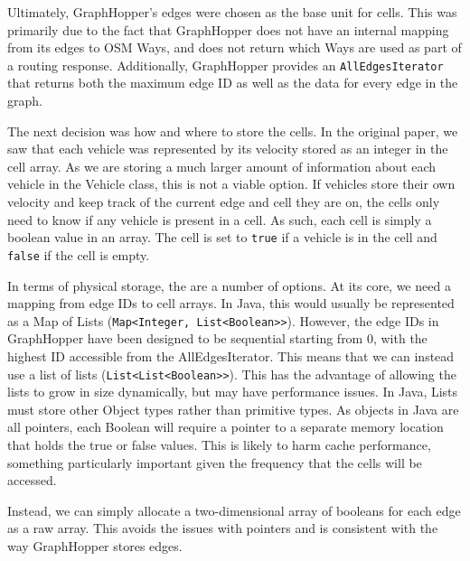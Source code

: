 \documentclass[ %
                    author={Alexander Hill},
                supervisor={Dr. Benjamin Sach},
                    degree={MEng},
                     title={MARMOSET},
                  subtitle={Multi-Agent Route Management using Online Simulation for Efficient Transportation},
                      type={research},
                      year={2016} ]{dissertation}
\begin{document}
Ultimately, GraphHopper's edges were chosen as the base unit for cells. This was
primarily due to the fact that GraphHopper does not have an internal mapping
from its edges to OSM Ways, and does not return which Ways are used as part of a
routing response. Additionally, GraphHopper provides an
\texttt{AllEdgesIterator} that returns both the maximum edge ID as well as the
data for every edge in the graph.

The next decision was how and where to store the cells. In the original paper, we
saw that each vehicle was represented by its velocity stored as an integer in
the cell array. As we are storing a much larger amount of information about each
vehicle in the Vehicle class, this is not a viable option. If vehicles store
their own velocity and keep track of the current edge and cell they are on, the
cells only need to know if any vehicle is present in a cell. As such, each cell
is simply a boolean value in an array. The cell is set to \texttt{true} if a
vehicle is in the cell and \texttt{false} if the cell is empty.

In terms of physical storage, the are a number of options. At its core, we need
a mapping from edge IDs to cell arrays. In Java, this would usually be
represented as a Map of Lists (\texttt{Map<Integer, List<Boolean>>}). However,
the edge IDs in GraphHopper have been designed to be sequential starting from 0,
with the highest ID accessible from the AllEdgesIterator. This means that we can
instead use a list of lists (\texttt{List<List<Boolean>>}). This has the
advantage of allowing the lists to grow in size dynamically, but may have
performance issues. In Java, Lists must store other Object types rather than
primitive types. As objects in Java are all pointers, each Boolean will require
a pointer to a separate memory location that holds the true or false values.
This is likely to harm cache performance, something particularly important given
the frequency that the cells will be accessed.

Instead, we can simply allocate a two-dimensional array of booleans for each
edge as a raw array. This avoids the issues with pointers and is consistent with
the way GraphHopper stores edges.
\end{document}

